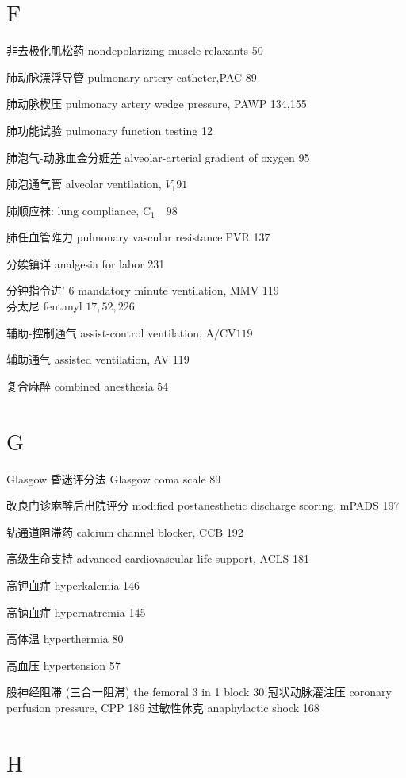 \documentclass[10pt]{article}
\begin{document}
\section*{$\mathrm{F}$}
非去极化肌松药 nondepolarizing muscle relaxants 50

肺动脉漂浮导管 pulmonary artery catheter,PAC 89

肺动脉楔压 pulmonary artery wedge pressure, PAWP 134,155

肺功能试验 pulmonary function testing 12

肺泡气-动脉血金分娾差 alveolar-arterial gradient of oxygen 95

肺泡通气管 alveolar ventilation, $V_{1} 91$

肺顺应祙: lung compliance, $\mathrm{C}_{1} \quad 98$

肺任血管陮力 pulmonary vascular resistance.PVR 137

分娭镇详 analgesia for labor 231

分钟指令进' 6 mandatory minute ventilation, MMV 119\\
芬太尼 fentanyl $17,52,226$

辅助-控制通气 assist-control ventilation, $\mathrm{A} / \mathrm{CV} 119$

辅助通气 assisted ventilation, AV 119

复合麻醉 combined anesthesia 54

\section*{$\mathrm{G}$}
Glasgow 昏迷评分法 Glasgow coma scale 89

改良门诊麻醉后出院评分 modified postanesthetic discharge scoring, mPADS 197

钻通道阻滞药 calcium channel blocker, CCB 192

高级生命支持 advanced cardiovascular life support, ACLS 181

高钾血症 hyperkalemia 146

高钠血症 hypernatremia 145

高体温 hyperthermia 80

高血压 hypertension 57

股神经阻滞 (三合一阻滞) the femoral 3 in 1 block 30 冠状动脉灌注压 coronary perfusion pressure, CPP 186 过敏性休克 anaphylactic shock 168

\section*{$\mathrm{H}$}
\end{document}
